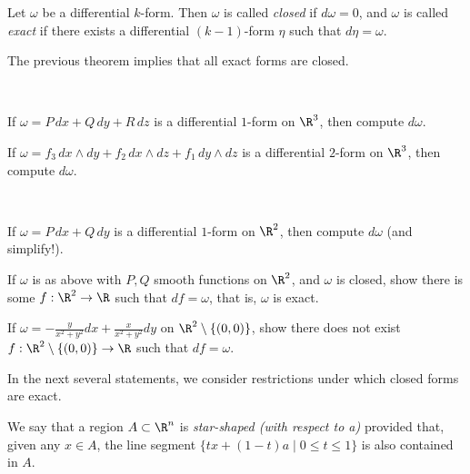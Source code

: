 \documentclass{book}
\begin{document}
\begin{definition}
Let $\omega$ be a differential $k$-form.
Then $\omega$ is called {\em closed} if $d\omega=0$, and $\omega$ is called {\em exact}
if there exists a differential $(k-1)$-form $\eta$ such that $d\eta=\omega$.
\end{definition}

\begin{remark}
The previous theorem implies that all exact forms are closed.
\end{remark}

\begin{exercise}\
\begin{exerenm}
\item
If $\omega= P\, dx+Q\, dy+R\,dz$ is a differential $1$-form on $\R^3$, then compute $d\omega$.

\item
If $\omega= f_3\, dx\wedge dy+f_2\, dx\wedge dz+f_1\,dy\wedge dz$ is a differential $2$-form 
on $\R^3$, then compute $d\omega$.
\end{exerenm}
\end{exercise}

\begin{exercise}\
\begin{exerenm}
\item
If $\omega= P\, dx+Q\, dy$ is a differential $1$-form on $\R^2$, then compute $d\omega$
(and simplify!).

\item
If $\omega$ is as above with $P, Q$ smooth functions on $\R^2$, and $\omega$ is closed, 
show there is some $f:\R^2\to\R$ such that $df=\omega$, that is, $\omega$ is exact.

\item
If $\displaystyle{\omega=-\frac{y}{x^2+y^2}dx+\frac{x}{x^2+y^2}dy}$ on $\R^2\setminus\{(0,0)\}$, 
show there does not exist $f:\R^2\setminus\{(0,0)\}\to\R$ such that $df=\omega$.
\end{exerenm}
\end{exercise}

\noindent
In the next several statements, we consider restrictions under which closed forms are exact.

\begin{definition}
We say that a region $A\subset\R^n$ is {\em star-shaped (with respect to a)} provided that,
given any $x\in A$, the line segment $\{tx+(1-t)a\mid 0\leq t\leq 1\}$ is also contained in $A$.
\end{definition}
\end{document}

